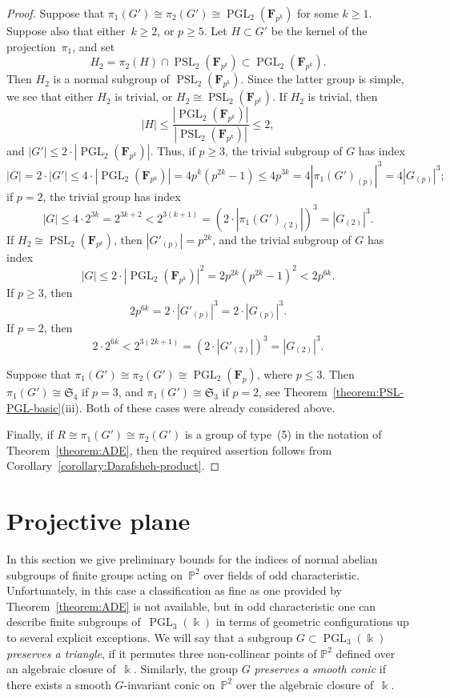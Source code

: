 \documentclass[12pt]{amsart}
\numberwithin{equation}{section}
\theoremstyle{definition}
\newcommand{\PP}{\mathbb P}
\DeclareMathOperator{\PGL}{PGL}
\DeclareMathOperator{\PSL}{PSL}
\def \ge {\geqslant}
\def \le {\leqslant}
\begin{document}
\begin{proof}
Suppose that $\pi_1(G')\cong\pi_2(G')\cong\PGL_2(\mathbf{F}_{p^k})$ for some $k\ge 1$. Suppose also that either~\mbox{$k\ge 2$}, or $p\ge 5$.
Let $H\subset G'$ be the kernel of the projection~$\pi_1$, and set
$$
H_2=\pi_2(H)\cap \PSL_2(\mathbf{F}_{p^k})\subset\PGL_2(\mathbf{F}_{p^k}).
$$
Then $H_2$ is a normal subgroup of $\PSL_2(\mathbf{F}_{p^k})$. Since the latter group is simple, we see that either $H_2$ is trivial, or $H_2\cong \PSL_2(\mathbf{F}_{p^k})$.
If $H_2$ is trivial, then
$$
|H|\le \frac{|\PGL_2(\mathbf{F}_{p^k})|}{|\PSL_2(\mathbf{F}_{p^k})|}\le 2,
$$
and $|G'|\le 2\cdot |\PGL_2(\mathbf{F}_{p^k})|$.
Thus, if $p\ge 3$, the trivial subgroup of $G$ has index
$$
|G|=2\cdot |G'|\le 4\cdot |\PGL_2(\mathbf{F}_{p^k})|= 4p^{k}(p^{2k}-1)\le 4p^{3k}=4|\pi_1(G')_{(p)}|^3=
4|G_{(p)}|^3;
$$
if $p=2$, the trivial group has index
$$
|G|\le 4\cdot 2^{3k}=2^{3k+2}<2^{3(k+1)}=(2\cdot |\pi_1(G')_{(2)}|)^3=|G_{(2)}|^3.
$$
If $H_2\cong\PSL_2(\mathbf{F}_{p^k})$, then $|G'_{(p)}|=p^{2k}$, and the trivial subgroup of $G$ has index
$$
|G|\le 2\cdot |\PGL_2(\mathbf{F}_{p^k})|^2=2p^{2k}(p^{2k}-1)^2<2p^{6k}.
$$
If $p\ge 3$, then
$$
2p^{6k}=2\cdot |G'_{(p)}|^3=2\cdot |G_{(p)}|^3.
$$
If $p=2$, then
$$
2\cdot 2^{6k}<2^{3(2k+1)}=(2\cdot |G'_{(2)}|)^3=|G_{(2)}|^3.
$$

Suppose that $\pi_1(G')\cong\pi_2(G')\cong\PGL_2(\mathbf{F}_{p})$,
where $p\le 3$. Then $\pi_1(G')\cong \mathfrak{S}_4$ if $p=3$, and
$\pi_1(G')\cong \mathfrak{S}_3$ if $p=2$,
see Theorem~\ref{theorem:PSL-PGL-basic}(iii).
Both of these cases were already considered above.

Finally, if $R\cong\pi_1(G')\cong\pi_2(G')$
is a group of type~(5) in the notation of Theorem~\ref{theorem:ADE},
then the required assertion follows from Corollary~\ref{corollary:Darafsheh-product}.
\end{proof}



\section{Projective plane}
\label{section:P2}

In this section we give preliminary bounds for the indices of normal abelian subgroups of finite
groups acting on~$\PP^2$ over fields of odd characteristic.
Unfortunately, in this case a classification as fine as one provided by
Theorem~\ref{theorem:ADE} is not available, but in odd characteristic
one can describe finite subgroups of~\mbox{$\PGL_3(\Bbbk)$}
in terms of geometric configurations up to several explicit exceptions.
We will say that a subgroup $G\subset\PGL_3(\Bbbk)$ \emph{preserves a triangle}, if
it permutes three non-collinear points of $\PP^2$ defined over an algebraic closure of~$\Bbbk$.
Similarly, the group $G$ \emph{preserves a smooth conic}
if there exists a smooth $G$-invariant conic on~$\PP^2$ over the algebraic closure
of~$\Bbbk$.
\end{document}
